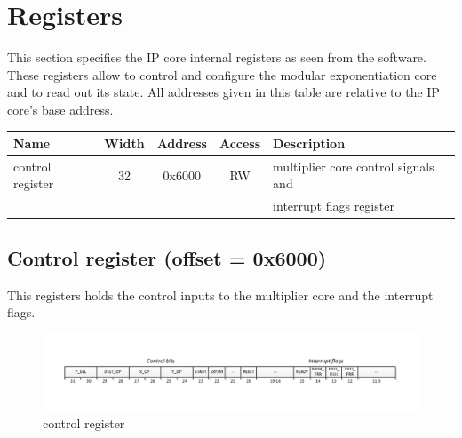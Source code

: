 \section{Registers}
This section specifies the IP core internal registers as seen from the software. These registers allow to control and
configure the modular exponentiation core and to read out its state. All addresses given in this table are relative to the
IP core's base address.\\
\newline
\begin{tabular}{|l|c|c|c|l|}
\hline
\rowcolor{Gray}
\textbf{Name} & \textbf{Width} & \textbf{Address} & \textbf{Access} & \textbf{Description} \bigstrut\\
\hline
control register 		& 32 & 0x6000 & RW 	& multiplier core control signals and \bigstrut[t]\\
						&	&		&		& interrupt flags register\bigstrut[b]\\
\hline
\end{tabular}%
\newpage
\subsection{Control register (offset = 0x6000)}
This registers holds the control inputs to the multiplier core and the interrupt flags.\\
\begin{figure}[H]
\centering
\includegraphics[trim=1.2cm 1.2cm 1.2cm 1.2cm, width=15cm]{pictures/axi_control_reg.pdf}
\caption{control register}
\end{figure}

